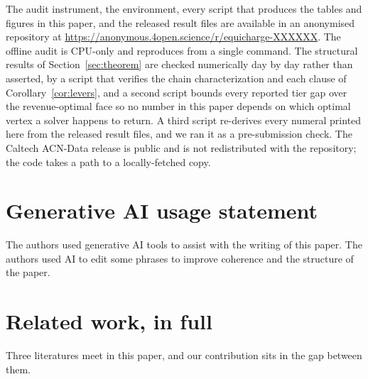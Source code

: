 \documentclass[manuscript, screen, review, anonymous]{acmart}
\begin{document}
The audit instrument, the environment, every script that produces the tables and figures
in this paper, and the released result files are available in an anonymised repository at
\url{https://anonymous.4open.science/r/equicharge-XXXXXX}. The offline audit is CPU-only
and reproduces from a single command. The structural results of
Section~\ref{sec:theorem} are checked numerically day by day rather than asserted, by a
script that verifies the chain characterization and each clause of
Corollary~\ref{cor:levers}, and a second script bounds every reported tier gap over the
revenue-optimal face so no number in this paper depends on which optimal vertex a solver
happens to return. A third script re-derives every numeral printed here from the released
result files, and we ran it as a pre-submission check. The Caltech ACN-Data release is
public and is not redistributed with the repository; the code takes a path to a
locally-fetched copy.

\section*{Generative AI usage statement}

The authors used generative AI tools to assist with the writing of this paper. The authors used AI to edit some phrases to improve coherence and the structure of the paper.





\appendix
\section{Related work, in full}
\label{app:related}
Three literatures meet in this paper, and our contribution sits in the gap between them.
\end{document}
